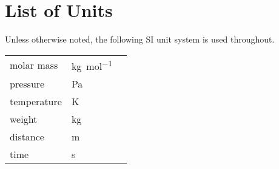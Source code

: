 \chapter*{List of Units}

Unless otherwise noted, the following SI unit system is used throughout.\vspace{1em}

\begin{longtable}{p{3cm}p{5cm}p{10cm}}
molar mass & \si{\kilo\gram\per\mole} &\\
pressure & \si{\pascal} &\\
temperature & \si{\kelvin} &\\
weight & \si{\kilo\gram} &\\
distance & \si{\meter} &\\
time & \si{\second} &\\
\end{longtable}
